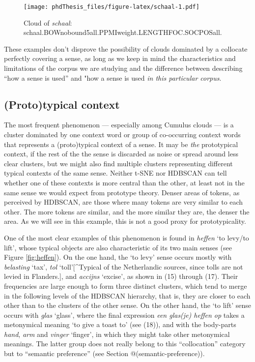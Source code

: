 \documentclass[
]{book}
\begin{document}
\begin{figure}
\centering
\texttt{[image: phdThesis\_files/figure-latex/schaal-1.pdf]}
\caption{\label{fig:schaal}Cloud of \emph{schaal}: schaal.BOWnobound5all.PPMIweight.LENGTHFOC.SOCPOSall.}
\end{figure}

These examples don't disprove the possibility of clouds dominated by a collocate perfectly covering a sense, as long as we keep in mind the characteristics and limitations of the corpus we are studying and the difference between describing ``how a sense is used'' and "how a sense is used \emph{in this particular corpus}.

\hypertarget{prototypical-context}{%
\subsection{(Proto)typical context}\label{prototypical-context}}

The most frequent phenomenon --- especially among Cumulus clouds --- is a cluster dominated by one context word or group of co-occurring context words that represents a (proto)typical context of a sense. It may be \emph{the} prototypical context, if the rest of the the sense is discarded as noise or spread around less clear clusters, but we might also find multiple clusters representing different typical contexts of the same sense. Neither t-SNE nor HDBSCAN can tell whether one of these contexts is more central than the other, at least not in the same sense we would expect from prototype theory. Denser areas of tokens, as perceived by HDBSCAN, are those where many tokens are very similar to each other. The more tokens are similar, and the more similar they are, the denser the area. As we will see in this example, this is not a good proxy for prototypicality.

One of the most clear examples of this phenomenon is found in \emph{heffen} `to levy/to lift', whose typical objects are also characteristic of its two main senses (see Figure \ref{fig:heffen}). On the one hand, the `to levy' sense occurs mostly with \emph{belasting} `tax', \emph{tol} `toll'{[}\^{}Typical of the Netherlandic sources, since tolls are not levied in Flanders.{]}, and \emph{accijns} `excise', as shown in (15) through (17). Their frequencies are large enough to form three distinct clusters, which tend to merge in the following levels of the HDBSCAN hierarchy, that is, they are closer to each other than to the clusters of the other sense. On the other hand, the `to lift' sense occurs with \emph{glas} `glass', where the final expression \emph{een glas(je) heffen op} takes a metonymical meaning `to give a toast to' (see (18)), and with the body-parts \emph{hand}, \emph{arm} and \emph{vinger} `finger', in which they might take other metonymical meanings. The latter group does not really belong to this ``collocation'' category but to ``semantic preference'' (see Section @(semantic-preference)).
\end{document}
